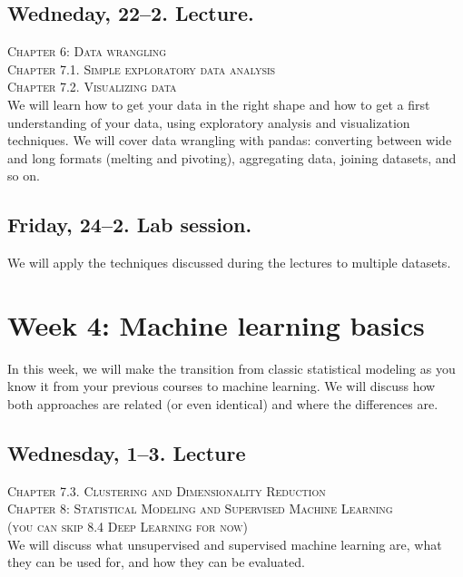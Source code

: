\subsection*{Wedneday, 22--2. Lecture.}
\textsc{ Chapter 6: Data wrangling}\\
\textsc{ Chapter 7.1. Simple exploratory data analysis}\\
\textsc{ Chapter 7.2. Visualizing data}\\

We will learn how to get your data in the right shape and how to get a first understanding of your data, using exploratory analysis and visualization techniques. We will cover data wrangling with pandas: converting between wide and long formats (melting and pivoting), aggregating data, joining datasets, and so on.


\subsection*{Friday, 24--2. Lab session.}
We will apply the techniques discussed during the lectures to multiple datasets.







\section*{Week 4: Machine learning basics}
In this week, we will make the transition from classic statistical modeling as you know it from your previous courses to machine learning. We will discuss how both approaches are related  (or even identical) and where the differences are.


\subsection*{Wednesday, 1--3. Lecture}
\textsc{ Chapter 7.3. Clustering and Dimensionality Reduction}\\
\textsc{ Chapter 8: Statistical Modeling and Supervised Machine Learning}\\
\textsc{ (you can skip 8.4 Deep Learning for now)}\\

We will discuss what unsupervised and supervised machine learning are, what they can be used for, and how they can be evaluated.

